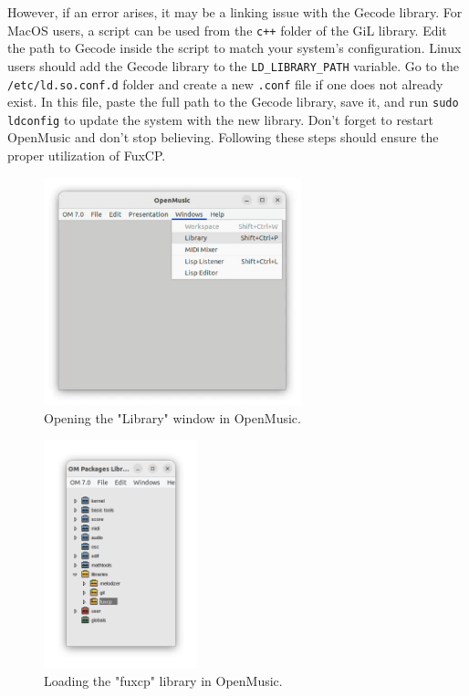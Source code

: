 However, if an error arises, it may be a linking issue with the Gecode library. For MacOS users, a script can be used from the \texttt{c++} folder of the GiL library. Edit the path to Gecode inside the script to match your system's configuration. Linux users should add the Gecode library to the \texttt{LD\_LIBRARY\_PATH} variable. Go to the \texttt{/etc/ld.so.conf.d} folder and create a new \texttt{.conf} file if one does not already exist. In this file, paste the full path to the Gecode library, save it, and run \texttt{sudo ldconfig} to update the system with the new library. Don't forget to restart OpenMusic and don't stop believing. Following these steps should ensure the proper utilization of FuxCP.

\begin{figure}[h]
    \centering
    \includegraphics[height=2.6in]{Images/openmusic_library.png}
    \caption{Opening the "Library" window in OpenMusic.}
    \label{fig:library}
\end{figure}
\begin{figure}[h]
    \centering
    \includegraphics[height=2.6in]{Images/openmusic_load.png}
    \caption{Loading the "fuxcp" library in OpenMusic.}
    \label{fig:load}
\end{figure}

